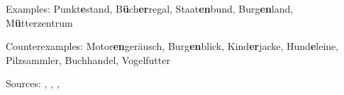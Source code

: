 \vspace{0.3em}

\noindent
Examples: Punkt\textbf{e}stand, B\textbf{ü}ch\textbf{er}regal, Staat\textbf{en}bund, Burg\textbf{en}land, M\textbf{ü}tter\textbf{\zeroLinker}zentrum

\noindent
Counterexamples: Motor\textbf{en}geräusch, Burg\textbf{en}blick, Kind\textbf{er}jacke, Hund\textbf{e}leine, Pilz{\zeroLinker}sammler, Buch{\zeroLinker}handel, Vogel{\zeroLinker}futter

\vspace{0.3em}

\noindent
Sources: \citet[3]{krott_etal_2007}, \citet[230, 231]{schaefer_2018}, \citet[20]{schluecker_2023}, \citet[173]{wegener_2005}